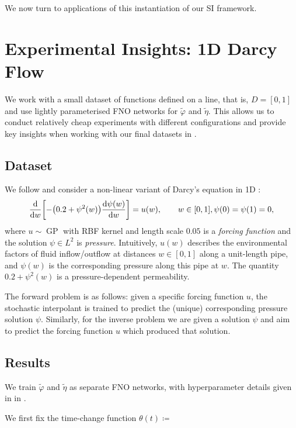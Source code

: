 We now turn to applications of this instantiation of our SI framework.

\section{Experimental Insights: 1D Darcy Flow} \label{sec:prelim}

We work with a small dataset of functions defined on a line, that is, \(D = [0, 1]\) and use lightly parameterised FNO networks for \(\widetilde{\varphi}\) and \(\widetilde{\eta}\). This allows us to conduct relatively cheap experiments with different configurations and provide key insights when working with our final datasets in .

\subsection{Dataset}
We follow \citep{bahmani2025resolution} and consider a non-linear variant of Darcy's equation in 1D \citep{whitaker1986flow}:
\[
  \dv{w}\qty[-\qty(0.2 + \psi^{2}(w)) \dv{\psi(w)}{w}] = u(w), \qquad w \in [0, 1], \psi(0) = \psi(1) = 0,
\]
where \(u \sim \operatorname{GP}\) with RBF kernel and length scale \(0.05\) is a \textit{forcing function} and the solution \(\psi \in L^{2}\) is \textit{pressure}. Intuitively,  \(u(w)\) describes the environmental factors of fluid inflow/outflow at distances \(w \in [0, 1]\) along a unit-length pipe, and \(\psi(w)\) is the corresponding pressure along this pipe at \(w\). The quantity \(0.2 + \psi^{2}(w)\) is a pressure-dependent permeability.

The forward problem is as follows: given a specific forcing function \(u\), the stochastic interpolant is trained to predict the (unique) corresponding pressure solution \(\psi\). Similarly, for the inverse problem we are given a solution \(\psi\) and aim to predict the forcing function \(u\) which produced that solution.

\subsection{Results}
We train \(\widetilde{\varphi}\) and \(\widetilde{\eta}\) as separate FNO networks, with hyperparameter details given in  in .

We first fix the time-change function \(\theta(t) \coloneqq \)


